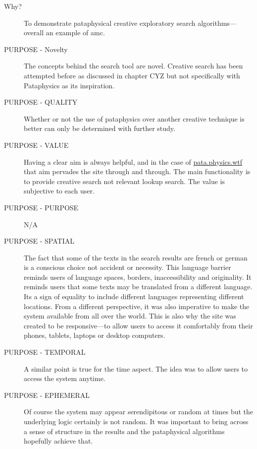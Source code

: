 \begin{description}
  \item[Why?] To demonstrate pataphysical creative exploratory search algorithms---overall an example of \gls{amc}.
  \item[PURPOSE - Novelty] The concepts behind the search tool are novel. Creative search has been attempted before as discussed in chapter CYZ but not specifically with Pataphysics as its inspiration.
  \item[PURPOSE - QUALITY] Whether or not the use of pataphysics over another creative technique is better can only be determined with further study.
  \item[PURPOSE - VALUE] Having a clear aim is always helpful, and in the case of \url{pata.physics.wtf} that aim pervades the site through and through. The main functionality is to provide creative search not relevant lookup search. The value is subjective to each user.
  \item[PURPOSE - PURPOSE] N/A
  \item[PURPOSE - SPATIAL] The fact that some of the texts in the search results are french or german is a conscious choice not accident or necessity. This language barrier reminds users of language spaces, borders, inaccessibility and originality. It reminds users that some texts may be translated from a different language. Its a sign of equality to include different languages representing different locations. From a different perspective, it was also imperative to make the system available from all over the world. This is also why the site was created to be responsive---to allow users to access it comfortably from their phones, tablets, laptops or desktop computers.
  \item[PURPOSE - TEMPORAL] A similar point is true for the time aspect. The idea was to allow users to access the system anytime.
  \item[PURPOSE - EPHEMERAL] Of course the system may appear serendipitous or random at times but the underlying logic certainly is not random. It was important to bring across a sense of structure in the results and the pataphysical algorithms hopefully achieve that.
\end{description}

\spirals

